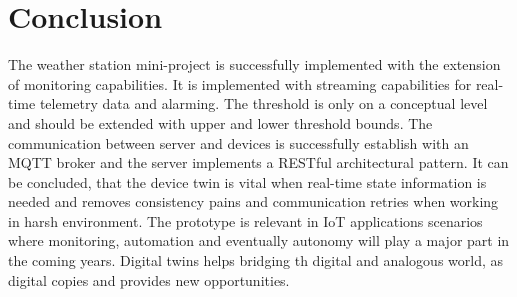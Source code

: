 \section{Conclusion} \label{sec:conclusion}
The weather station mini-project is successfully implemented with the extension of monitoring capabilities. It is implemented with streaming capabilities for real-time telemetry data and alarming. The threshold is only on a conceptual level and should be extended with upper and lower threshold bounds. The communication between server and devices is successfully establish with an MQTT broker and the server implements a RESTful architectural pattern. It can be concluded, that the device twin is vital when real-time state information is needed and removes consistency pains and communication retries when working in harsh environment. 
The prototype is relevant in IoT applications scenarios where monitoring, automation and eventually autonomy will play a major part in the coming years. Digital twins helps bridging th digital and analogous world, as digital copies and provides new opportunities.

